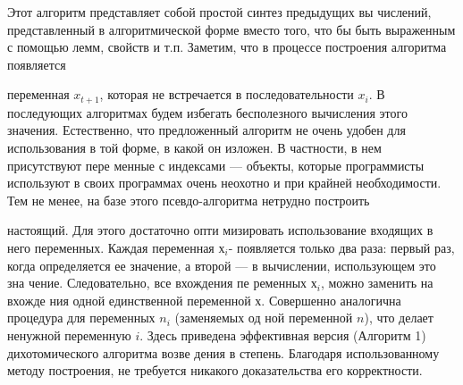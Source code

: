 Этот алгоритм представляет собой простой синтез предыдущих вы­
числений, представленный в алгоритмической форме вместо того, что­
бы быть выраженным с помощью лемм, свойств и т.п. Заметим, что в процессе построения алгоритма появляется
\pagebreak

\noindent переменная $x_{t+1}$, которая
не встречается в последовательности $x_{i}$. В последующих алгоритмах
будем избегать бесполезного вычисления этого значения. Естественно,
что предложенный алгоритм не очень удобен для использования в той
форме, в какой он изложен. В частности, в нем присутствуют пере­
менные с индексами — объекты, которые программисты используют в
своих программах очень неохотно и при крайней необходимости.
Тем не менее, на базе этого псевдо-алгоритма нетрудно построить
настоящий. Для этого достаточно опти­
мизировать использование входящих в
него переменных. Каждая переменная \textit{$х_{i}$}-
появляется только два раза: первый раз,
когда определяется ее значение, а второй
— в вычислении, использующем это зна­
чение. Следовательно, все вхождения пе­
ременных \textit{$х_{i}$}, можно заменить на вхожде­
ния одной единственной переменной \textit{$х$}.
Совершенно аналогична процедура для переменных \textit{$n_{i}$} (заменяемых од­
ной переменной \textit{$n$}), что делает ненужной переменную \textit{$i$}. Здесь приведена
эффективная версия (Алгоритм 1) дихотомического алгоритма возве­
дения в степень. Благодаря использованному методу построения, не
требуется никакого доказательства его корректности.

